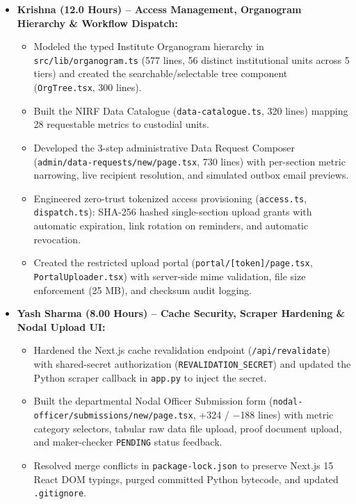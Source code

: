 \documentclass[11pt,a4paper]{article}
\begin{document}
\begin{itemize}[leftmargin=1.4em, itemsep=3pt]
\item \textbf{Krishna (12.0 Hours) -- Access Management, Organogram Hierarchy \& Workflow Dispatch:}
  \begin{itemize}[leftmargin=1.2em, itemsep=1.5pt]
  \item Modeled the typed Institute Organogram hierarchy in \texttt{src/lib/organogram.ts} (577 lines, 56 distinct institutional units across 5 tiers) and created the searchable/selectable tree component (\texttt{OrgTree.tsx}, 300 lines).
  \item Built the NIRF Data Catalogue (\texttt{data-catalogue.ts}, 320 lines) mapping 28 requestable metrics to custodial units.
  \item Developed the 3-step administrative Data Request Composer (\texttt{admin/data-requests/new/page.tsx}, 730 lines) with per-section metric narrowing, live recipient resolution, and simulated outbox email previews.
  \item Engineered zero-trust tokenized access provisioning (\texttt{access.ts}, \texttt{dispatch.ts}): SHA-256 hashed single-section upload grants with automatic expiration, link rotation on reminders, and automatic revocation.
  \item Created the restricted upload portal (\texttt{portal/[token]/page.tsx}, \texttt{PortalUploader.tsx}) with server-side mime validation, file size enforcement (25 MB), and checksum audit logging.
  \end{itemize}

\item \textbf{Yash Sharma (8.00 Hours) -- Cache Security, Scraper Hardening \& Nodal Upload UI:}
  \begin{itemize}[leftmargin=1.2em, itemsep=1.5pt]
  \item Hardened the Next.js cache revalidation endpoint (\texttt{/api/revalidate}) with shared-secret authorization (\texttt{REVALIDATION\_SECRET}) and updated the Python scraper callback in \texttt{app.py} to inject the secret.
  \item Built the departmental Nodal Officer Submission form (\texttt{nodal-officer/submissions/new/page.tsx}, +324 / $-$188 lines) with metric category selectors, tabular raw data file upload, proof document upload, and maker-checker \texttt{PENDING} status feedback.
  \item Resolved merge conflicts in \texttt{package-lock.json} to preserve Next.js 15 React DOM typings, purged committed Python bytecode, and updated \texttt{.gitignore}.
  \end{itemize}


\end{itemize}
\end{document}
